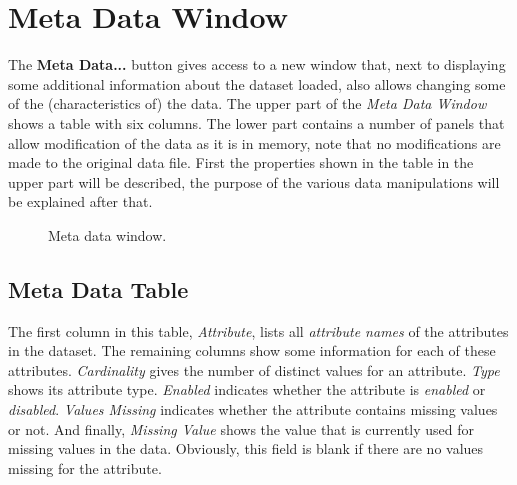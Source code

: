 \documentclass{article}
\begin{document}
\section{Meta Data Window}
\label{section:meta-data-window}
The \textbf{Meta Data...} button gives access to a new window that, next to displaying some additional information about the dataset loaded, also allows changing some of the (characteristics of) the data.
The upper part of the \emph{Meta Data Window} shows a table with six columns.
The lower part contains a number of panels that allow modification of the data as it is in memory, note that no modifications are made to the original data file.
First the properties shown in the table in the upper part will be described, the purpose of the various data manipulations will be explained after that.

\begin{figure}
\begin{center}
\centering
{}
\caption{Meta data window.}
\end{center}
\label{fig:metadatawindow}
\end{figure}



\subsection{Meta Data Table}
\label{meta-data-window:meta-data-table}
The first column in this table, \emph{Attribute}, lists all \emph{attribute names} of the attributes in the dataset.
The remaining columns show some information for each of these attributes.
\emph{Cardinality} gives the number of distinct values for an attribute.
\emph{Type} shows its attribute type.
\emph{Enabled} indicates whether the attribute is \emph{enabled} or \emph{disabled}.
\emph{Values Missing} indicates whether the attribute contains missing values or not.
And finally, \emph{Missing Value} shows the value that is currently used for missing values in the data.
Obviously, this field is blank if there are no values missing for the attribute.
\end{document}
